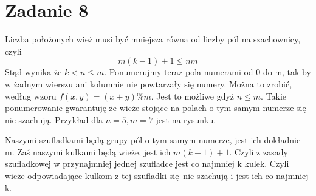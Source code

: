 \documentclass{article}
\begin{document}
\newpage
\section*{Zadanie 8}

Liczba położonych wież musi być mniejsza równa od liczby pól na szachownicy, czyli 
\[m(k-1) + 1 \leq n m\]
Stąd wynika że $k < n \leq m$. Ponumerujmy teraz pola numerami od 0 do m, tak by w żadnym wierszu ani kolumnie nie powtarzały się numery. Można to zrobić, według wzoru $f(x,y) = (x+y) \% m$. Jest to możliwe gdyż $n \leq m$. Takie ponumerowanie gwarantuję że wieże stojące na polach o tym samym numerze się nie szachują.
Przykład dla $n = 5, m = 7$ jest na rysunku.
\begin{center}
\end{center}
Naszymi szufladkami będą grupy pól o tym samym numerze, jest ich dokładnie m. Zaś naszymi kulkami będą wieże, jest ich $m(k-1) + 1$. Czyli z zasady szufladkowej w przynajmniej jednej szufladce jest co najmniej k kulek. Czyli wieże odpowiadające kulkom z tej szufladki się nie szachują i jest ich co najmniej k.
\end{document}
